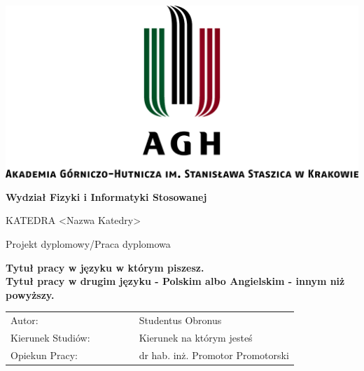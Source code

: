 \thispagestyle{empty}
\begin{center}
\includegraphics[height=72mm]{Import/agh_nzw_s_pl_1w_wbr_rgb_150ppi_v2.png}\\
\vspace{2mm}
{\large\textsf{\textbf{Wydział Fizyki i Informatyki Stosowanej}}}\\
\vspace{2mm}


{\large \textsf{KATEDRA <Nazwa Katedry>}}

\vspace{14mm}
{\LARGE \textsf{Projekt dyplomowy/Praca dyplomowa}}\\
\vspace{10mm}


{\bf \LARGE \textsf{Tytuł pracy w języku w którym piszesz.}}\\
\vspace{6mm}
{\bf \LARGE \textsf{Tytuł pracy w drugim języku - Polskim albo Angielskim - innym niż powyższy.}}\\
\end{center}

\vspace{15ex}

\begin{table}[th]
\begin{tabular}{llllllllll}
Autor:& & & & & 
\multicolumn{5}{l}{Studentus Obronus}\\
Kierunek Studiów:& & & & &  
\multicolumn{5}{l}{Kierunek na którym jesteś}\\
Opiekun Pracy:& & & & & 
\multicolumn{5}{l}{dr hab. inż. Promotor Promotorski}
\end{tabular}
\end{table}

